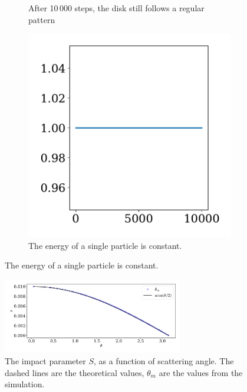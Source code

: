 \documentclass{article}
\begin{document}
\begin{figure}[H]
\begin{subfigure}{.35\textwidth}
            \caption{After 10\,000 steps, the disk still follows a regular pattern}
            \label{single particle}
        \end{subfigure}
        \begin{subfigure}{.64\textwidth}
            \centering
            \includegraphics[width=.8\textwidth]{../plots/test_case_one_particle/energy.pdf}
            \caption{The energy of a single particle is constant.}
            \label{single particle energy}
        \end{subfigure}
    \end{figure}

    \begin{figure}[H]
        \centering
        \hspace{-10mm}
        \includegraphics[width=0.7\textwidth]{../plots/test_case_collision_angle/collision_angle.pdf}
        \caption{The impact parameter $S$, as a function of scattering angle. The dashed lines are the theoretical values, $\theta_m$ are the values from the simulation.}
        \label{scattering}
    \end{figure}
\end{document}
